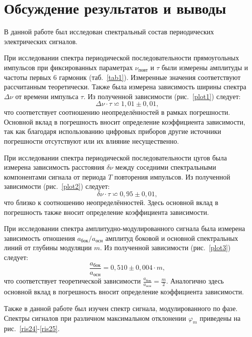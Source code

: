 \documentclass[a4paper, 12pt]{article}
\begin{document}
\section{Обсуждение результатов и выводы}

В данной работе был исследован спектральный состав периодических электрических сигналов.

При исследовании спектра периодической последовательности прямоугольных импульсов при фиксированных параметрах $\nu_{повт}$ и $\tau$ были измерены амплитуды и частоты первых 6 гармоник (таб.~\ref{tab1}). Измеренные значения соответствуют рассчитанным теоретически. Также была измерена зависимость ширины спектра $\Delta{\nu}$ от времени импульса $\tau$. Из полученной зависимости (рис.~\ref{plot1}) следует: $$\Delta{\nu} \cdot \tau \backsimeq 1,01\pm0,01,$$ что соответствует соотношению неопределённостей в рамках погрешности. Основной вклад в погрешность вносит определение коэффициента зависимости, так как благодаря использованию цифровых приборов другие источники погрешности отсутствуют или их влияние несущественно.

При исследовании спектра периодической последовательности цугов была измерена зависимость расстояния $\delta{\nu}$ между соседними спектральными компонентами сигнала от периода $T$ повторения импульсов. Из полученной зависимости (рис.~\ref{plot2}) следует: $$\delta{\nu} \cdot \tau \backsimeq 0,95\pm0,01,$$ что близко к соотношению неопределённостей. Здесь основной вклад в погрешность также вносит определение коэффициента зависимости.

При исследовании спектра амплитудно-модулированного сигнала была измерена зависимость отношения $a_{бок}/a_{осн}$ амплитуд боковой и основной спектральных линий от глубины модуляции $m$. Из полученной зависимости (рис.~\ref{plot3}) следует: $$\frac{a_{бок}}{a_{осн}} = 0,510\pm0,004 \cdot m,$$ что соответствует теоретической зависимости $\frac{a_{бок}}{a_{осн}} = \frac{m}{2}$. Аналогично здесь основной вклад в погрешность вносит определение коэффициента зависимости.

Также в данной работе был изучен спектр сигнала, модулированного по фазе. Спектры сигналов при различном максимальном отклонении $\varphi_m$ приведены на рис.~\ref{ris24}-\ref{ris25}.
\end{document}

